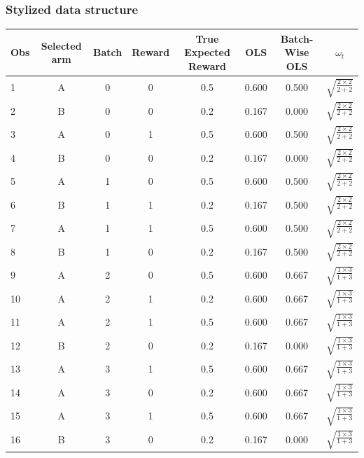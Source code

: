 \documentclass[11pt,table]{beamer}
\begin{document}
\begin{frame}\frametitle{Stylized data structure}
\renewcommand{\baselinestretch}{1}

\begin{table}[htbp]
\centering 

\label{tab:data_structure}
\begin{threeparttable}
\tiny
\begin{tabular}{@{\extracolsep{-5pt}}l*{7}{c}}
\toprule
Obs & Selected  arm & Batch & Reward & True Expected Reward & OLS& Batch-Wise OLS & $\omega_t$\\
\midrule
1 & A & 0 & 0 & 0.5 & 0.600 & 0.500& $\sqrt{\frac{2\times 2}{2+2}}$ \\
2 & B & 0 & 0 & 0.2 & 0.167 & 0.000 &$\sqrt{\frac{2\times 2}{2+2}}$\\
3 & A & 0 & 1 & 0.5 & 0.600 & 0.500& $\sqrt{\frac{2\times 2}{2+2}}$\\
4 & B & 0 & 0 & 0.2 & 0.167 & 0.000& $\sqrt{\frac{2\times 2}{2+2}}$\\
\rowcolor{blue1!20}
5 & A & 1 & 0 & 0.5 & 0.600 & 0.500& $\sqrt{\frac{2\times 2}{2+2}}$\\
\rowcolor{blue1!20}
6 & B & 1 & 1 & 0.2 & 0.167 & 0.500& $\sqrt{\frac{2\times 2}{2+2}}$\\
\rowcolor{blue1!20}
7 & A & 1 & 1 & 0.5 &  0.600& 0.500& $\sqrt{\frac{2\times 2}{2+2}}$\\
\rowcolor{blue1!20}
8 & B & 1 & 0 & 0.2 &  0.167& 0.500& $\sqrt{\frac{2\times 2}{2+2}}$\\
\rowcolor{blue1!40}
9 & A & 2 & 0 & 0.5 & 0.600 & 0.667& $\sqrt{\frac{1\times 3}{1+3}}$\\
\rowcolor{blue1!40}
10 & A & 2 & 1 & 0.2 & 0.600 & 0.667&$\sqrt{\frac{1\times 3}{1+3}}$\\
\rowcolor{blue1!40}
11 & A & 2 & 1 & 0.5 & 0.600 & 0.667&$\sqrt{\frac{1\times 3}{1+3}}$\\
\rowcolor{blue1!40}
12 & B & 2 & 0 & 0.2 & 0.167 & 0.000&$\sqrt{\frac{1\times 3}{1+3}}$\\
\rowcolor{blue1!60}
13 & A & 3 & 1 & 0.5 & 0.600 & 0.667&$\sqrt{\frac{1\times 3}{1+3}}$\\
\rowcolor{blue1!60}
14 & A & 3 & 0 & 0.2 & 0.600 & 0.667&$\sqrt{\frac{1\times 3}{1+3}}$\\
\rowcolor{blue1!60}
15 & A & 3 & 1 & 0.5 & 0.600 & 0.667&$\sqrt{\frac{1\times 3}{1+3}}$\\
\rowcolor{blue1!60}
16 & B & 3 & 0 & 0.2 & 0.167 & 0.000&$\sqrt{\frac{1\times 3}{1+3}}$\\

\end{tabular}
\end{threeparttable}
\end{table}
\end{frame}
\end{document}
